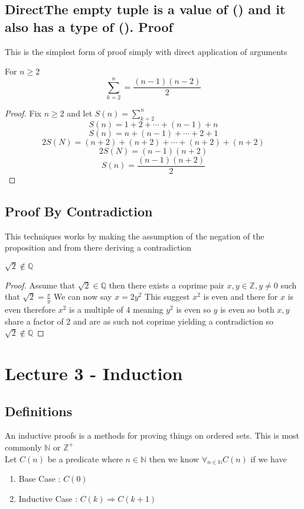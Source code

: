 \documentclass{article}
\begin{document}
\subsection{DirectThe empty tuple is a value of () and it also has a type of ().
 Proof}
This is the simplest form of proof simply with direct application of arguments
\begin{proposition}
    For $n \ge 2$
    \[\sum_{k=2}^{n} = \frac{(n-1)(n-2)}{2}\]
\end{proposition}
\begin{proof}
    Fix $n \ge 2$ and let $S(n) = \sum_{k=2}^{n}$
    \[S(n) = 1 + 2 + \cdots + (n-1) + n\]
    \[S(n) = n + (n-1) + \cdots + 2 + 1\]
    \[2S(N) = (n+2) + (n + 2) + \cdots + (n+ 2) + (n + 2)\]
    \[2S(N) = (n-1)(n+2)\]
    \[S(n) = \frac{(n-1)(n+2)}{2}\]
\end{proof}
\subsection{Proof By Contradiction}
This techniques works by making the assumption of the negation of the proposition and from there deriving a contradiction
\begin{proposition}
    $\sqrt{2} \notin \mathbb{Q}$
\end{proposition}
\begin{proof}
    Assume that $\sqrt{2} \in \mathbb{Q}$ then there exists a coprime pair $x,y \in \mathbb{Z},y \ne 0$ such that $\sqrt{2} = \frac{x}{y}$
    \newline
    We can now say $x = 2y^{2}$
    \newline
    This suggest ${x^2}$ is even and there for $x$ is even therefore $x^2$ is a multiple of 4 meaning $y^2$ is even so $y $ is even so both $x,y$ share a factor of 2 and are as such not coprime yielding a contradiction so $\sqrt{2} \notin \mathbb{Q}$
\end{proof}
\section{Lecture 3 - Induction}
\subsection{Definitions}
An inductive proofs is a methods for proving things on ordered sets. This is most commonly $\mathbb{N}$ or $\mathbb{Z}^{+}$
\\
Let $C(n)$ be a predicate where $n \in \mathbb{N}$ then we know $\forall_{n \in \mathbb{N}}C(n)$ if we have 
\begin{enumerate}
    \item Base Case : $C(0)$
    \item Inductive Case : $C(k) \Rightarrow C(k+1)$
\end{enumerate}
\end{document}
